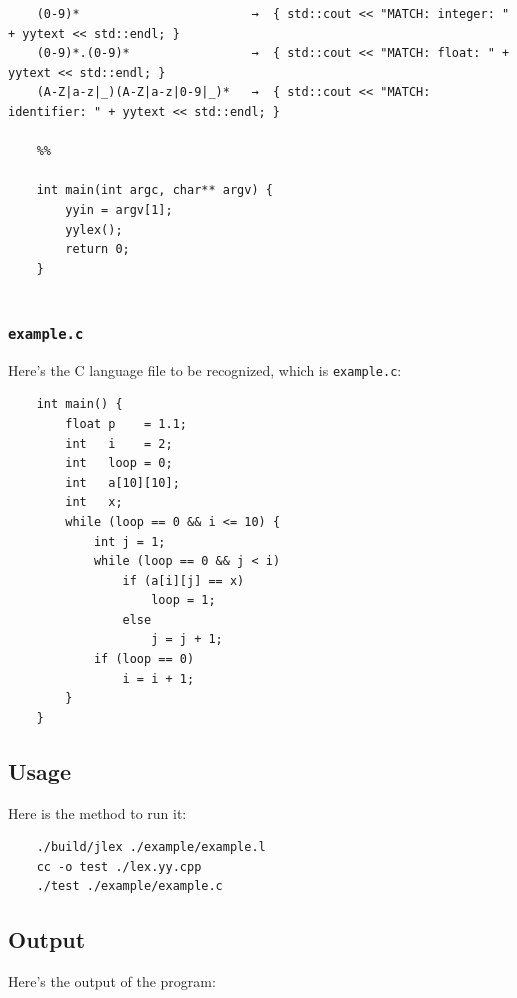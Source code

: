 \documentclass{article}
\begin{document}
\begin{lstlisting}
    (0-9)*                        →  { std::cout << "MATCH: integer: " + yytext << std::endl; }
    (0-9)*.(0-9)*                 →  { std::cout << "MATCH: float: " + yytext << std::endl; }
    (A-Z|a-z|_)(A-Z|a-z|0-9|_)*   →  { std::cout << "MATCH: identifier: " + yytext << std::endl; }
    
    %%
    
    int main(int argc, char** argv) {
        yyin = argv[1];
        yylex();
        return 0;
    }
    
\end{lstlisting}

\subsubsection{\texttt{example.c}}

Here's the C language file to be recognized, which is \texttt{example.c}:

\begin{lstlisting}
    int main() {
        float p    = 1.1;
        int   i    = 2;
        int   loop = 0;
        int   a[10][10];
        int   x;
        while (loop == 0 && i <= 10) {
            int j = 1;
            while (loop == 0 && j < i)
                if (a[i][j] == x)
                    loop = 1;
                else
                    j = j + 1;
            if (loop == 0)
                i = i + 1;
        }
    }
\end{lstlisting}

\subsection{Usage}

Here is the method to run it:

\begin{lstlisting}
    ./build/jlex ./example/example.l
    cc -o test ./lex.yy.cpp
    ./test ./example/example.c
\end{lstlisting}

\subsection{Output}

Here's the output of the program:
\end{document}
